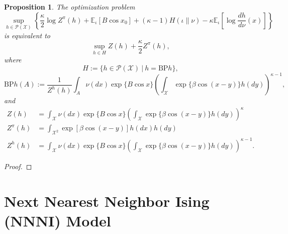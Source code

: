 \documentclass[12pt]{article}
\newtheorem{proposition}[theorem]{Proposition}
\numberwithin{equation}{section}
\begin{document}
\begin{proposition}
    The optimization problem
    \begin{equation*}
        \sup_{h\in\mathcal{P}(\mathcal{X})}\left\{\frac\kappa2\log Z^\pi(h) + \mathbb{E}_{\iota}\left[B\cos x_0\right] + (\kappa-1)H(\iota \| \nu)
        - \kappa\mathbb{E}_{\iota}\left[\log\frac{dh}{d\nu}(x)\right]\right\}
    \end{equation*}
    is equivalent to
    \begin{equation*}
        \sup_{h\in H} Z(h) + \frac\kappa2Z^\pi(h),
    \end{equation*}
    where
    \begin{equation*}
        H := \{h\in \mathcal{P}(\mathcal{X})\ |\ h=\text{BP}h\},
    \end{equation*}
    \begin{equation}
        \text{BP}h(A) := \frac{1}{Z^h(h)}\int_A \nu(dx)\exp\{B\cos x\}\left(\int_{\mathcal{X}}\exp\{\beta\cos(x-y)\}h(dy)\right)^{\kappa-1},
    \end{equation}
    and
    \begin{equation}
        \begin{aligned}
            Z (h)    & = \int_{\mathcal{X}} \nu(dx) \exp\{B\cos x\} \left(\int_\mathcal{X}\exp\{\beta\cos(x-y)\}h(dy)\right)^\kappa       \\
            Z^\pi(h) & = \int_{\mathcal{X}^2} \exp\left[\beta\cos(x- y)\right]h(dx)h(dy)                                                  \\
            Z^h(h)   & = \int_{\mathcal{X}} \nu(dx) \exp\{B\cos x\}\left(\int_{\mathcal{X}}\exp\{\beta\cos(x-y)\}h(dy)\right)^{\kappa-1}.
        \end{aligned}
    \end{equation}
\end{proposition}

\begin{proof}

\end{proof}


\newpage

\section{Next Nearest Neighbor Ising (NNNI) Model}
\end{document}
